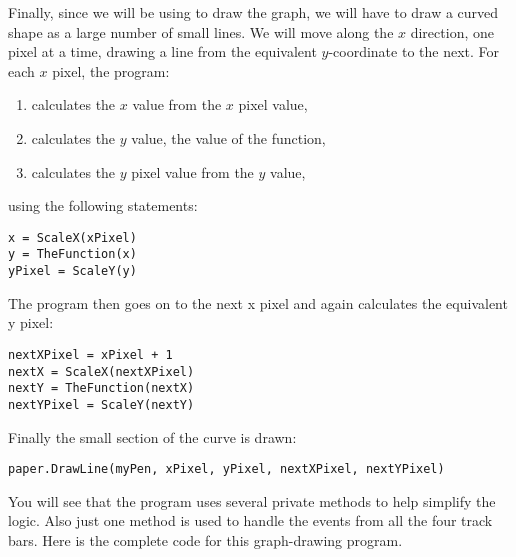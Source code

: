 		Finally, since we will be using  to draw the graph, we will have to draw a curved shape as a large number of small lines. We will move along the $x$ direction, one pixel at a time, drawing a line from the equivalent $y$-coordinate to the next. For each $x$ pixel, the program:
		\begin{enumerate}
			\item	calculates the $x$ value from the $x$ pixel value,
			\item	calculates the $y$ value, the value of the function,
			\item	calculates the $y$ pixel value from the $y$ value,
		\end{enumerate}
		using the following statements:
		\begin{lstlisting}
x = ScaleX(xPixel)
y = TheFunction(x)
yPixel = ScaleY(y)
		\end{lstlisting}
		The program then goes on to the next x pixel and again calculates the equivalent y pixel:
		\begin{lstlisting}
nextXPixel = xPixel + 1
nextX = ScaleX(nextXPixel)
nextY = TheFunction(nextX)
nextYPixel = ScaleY(nextY)
		\end{lstlisting}
		Finally the small section of the curve is drawn:
		\begin{lstlisting}
paper.DrawLine(myPen, xPixel, yPixel, nextXPixel, nextYPixel)
		\end{lstlisting}
		You will see that the program uses several private methods to help simplify the logic. Also just one method is used to handle the events from all the four track bars. Here is the complete code for this graph-drawing program.
		
